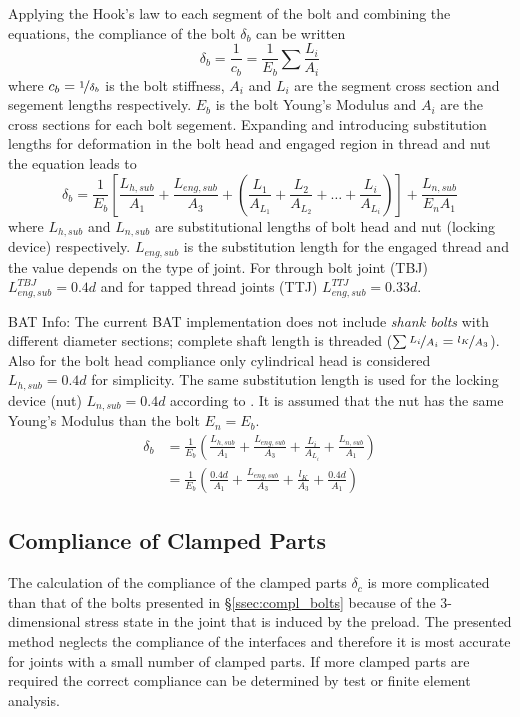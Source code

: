 Applying the Hook's law to each segment of the bolt and combining the equations, the compliance of the 
bolt $\delta_b$ can be written
\begin{equation}
  \delta_b = \frac{1}{c_b}=\frac{1}{E_b}\sum\frac{L_i}{A_i}
  \label{equ:delta_b_1}
\end{equation}
where $c_b=\nicefrac{1}{\delta_b}$ is the bolt stiffness, $A_i$ and $L_i$ are the segment cross section 
and segement lengths respectively. $E_b$ is the bolt Young's Modulus and 
$A_i$ are the cross sections for each bolt segement. Expanding  and introducing 
substitution lengths for deformation in the bolt head and engaged region in thread and nut the equation
leads to
\begin{equation}
  \delta_b = \frac{1}{E_b}\left[\frac{L_{h,sub}}{A_1}+\frac{L_{eng,sub}}{A_3}+\left(
    \frac{L_1}{A_{L_1}}+\frac{L_2}{A_{L_2}}+\dots+\frac{L_i}{A_{L_i}}\right)\right]
    +\frac{L_{n,sub}}{E_n A_1}
\end{equation}
where $L_{h,sub}$ and $L_{n,sub}$ are substitutional lengths of bolt head and nut (locking device) 
respectively. $L_{eng,sub}$ is the substitution length for the engaged thread and the value depends 
on the type of joint. For through bolt joint (TBJ) $L_{eng,sub}^{TBJ}=0.4d$ and for tapped thread 
joints (TTJ) $L_{eng,sub}^{TTJ}=0.33d$.
\begin{colbox}{BAT Info:}
  The current BAT implementation does not include \emph{shank bolts} with different diameter sections; 
  complete shaft length is threaded ($\sum \nicefrac{L_i}{A_i} = \nicefrac{l_K}{A_3}$). Also for the bolt head compliance only cylindrical
  head is considered $L_{h,sub}=0.4d$ for simplicity. The same substitution length is used for the
  locking device (nut) $L_{n,sub}=0.4d$ according to \cite{ECSS_HB_32_23A}. It is assumed that the nut
  has the same Young's Modulus than the bolt $E_n=E_b$. 
  \begin{subequations}
    \begin{align}
      \delta_b &= \frac{1}{E_b}\left(\frac{L_{h,sub}}{A_1}+\frac{L_{eng,sub}}{A_3}
        +\frac{L_i}{A_{L_i}}+\frac{L_{n,sub}}{A_1}\right) \\
        &= \frac{1}{E_b}\left(\frac{0.4d}{A_1}+\frac{L_{eng,sub}}{A_3}
        +\frac{l_K}{A_3}+\frac{0.4d}{A_1}\right)
    \end{align}
  \end{subequations}
\end{colbox}

\subsection{Compliance of Clamped Parts}
The calculation of the compliance of the clamped parts $\delta_c$ is more complicated than that of the 
bolts presented in §\ref{ssec:compl_bolts} because of the 3-dimensional stress state in the joint that 
is induced by the preload. The presented method \cite{ECSS_HB_32_23A} neglects the compliance of the 
interfaces and therefore it is most accurate for joints with a small number of clamped parts. If more
clamped parts are required the correct compliance can be determined by test or finite element analysis.


